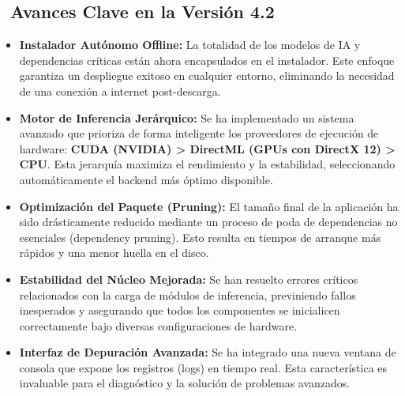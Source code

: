\documentclass[11pt, a4paper]{article}
\newcommand{\SectionColor}{WarlockGray} %
\newcommand{\setsectioncolor}[1]{\renewcommand{\SectionColor}{#1}}
\begin{document}
\subsection{\faBoxOpen\ Avances Clave en la Versión 4.2}
\begin{itemize}[leftmargin=*, itemsep=2pt]
    \item \textbf{Instalador Autónomo Offline:} La totalidad de los modelos de IA y dependencias críticas están ahora encapsulados en el instalador. Este enfoque garantiza un despliegue exitoso en cualquier entorno, eliminando la necesidad de una conexión a internet post-descarga.
    \item \textbf{Motor de Inferencia Jerárquico:} Se ha implementado un sistema avanzado que prioriza de forma inteligente los proveedores de ejecución de hardware: \textbf{CUDA (NVIDIA) \textgreater{} DirectML (GPUs con DirectX 12) \textgreater{} CPU}. Esta jerarquía maximiza el rendimiento y la estabilidad, seleccionando automáticamente el backend más óptimo disponible.
    \item \textbf{Optimización del Paquete (Pruning):} El tamaño final de la aplicación ha sido drásticamente reducido mediante un proceso de poda de dependencias no esenciales (dependency pruning). Esto resulta en tiempos de arranque más rápidos y una menor huella en el disco.
    \item \textbf{Estabilidad del Núcleo Mejorada:} Se han resuelto errores críticos relacionados con la carga de módulos de inferencia, previniendo fallos inesperados y asegurando que todos los componentes se inicialicen correctamente bajo diversas configuraciones de hardware.
    \item \textbf{Interfaz de Depuración Avanzada:} Se ha integrado una nueva ventana de consola que expone los registros (logs) en tiempo real. Esta característica es invaluable para el diagnóstico y la solución de problemas avanzados.
\end{itemize}

\setsectioncolor{QuickStartColor}
\end{document}
